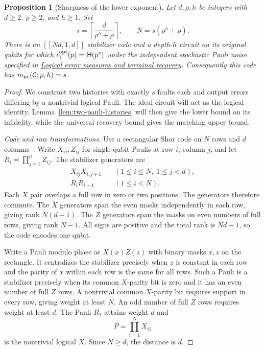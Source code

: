 \documentclass[aps,prl,reprint,notitlepage,nofootinbib,nobibnotes]{revtex4-2}
\newtheorem{proposition}{Proposition}
\begin{document}
\begin{proposition}[Sharpness of the lower exponent]
\label{prop:lower-saturation}
Let $d,\rho,h$ be integers with $d\ge2$, $\rho\ge2$, and $h\ge1$. Set
\begin{equation}\label{em:lower-parameters}
 s=\left\lceil\frac{d}{\rho^h+\rho}\right\rceil,\qquad
 N=s(\rho^h+\rho).
\end{equation}
There is an $[[Nd,1,d]]$ stabilizer code  and a depth-$h$ circuit on its original qubits
for which
$\epsilon_{\rm L}^{\rm opt}(p)=\Theta(p^s)$ under the independent stochastic Pauli noise specified
in \hyperref[sm:logical-error-measures]{Logical error measures and terminal recovery}. Consequently
this code has $m_{\rm pc}(\mathcal C;\rho,h)=s$.
\end{proposition}

\begin{proof}
We construct two histories with exactly $s$ faults each and output errors differing by a nontrivial
logical Pauli. The ideal circuit will act as the logical identity.
Lemma~\ref{lem:two-pauli-histories} will then give the lower bound on its infidelity, while the
universal recovery bound gives the matching upper bound.

\emph{Code and row transformations.}
Use a rectangular Shor code on $N$ rows and $d$ columns~\cite{BaconCasaccino}. Write
$X_{ij},Z_{ij}$ for single-qubit Paulis at row $i$, column $j$, and let $R_i=\prod_{j=1}^d Z_{ij}$.
The stabilizer generators are
\begin{align}
 X_{ij}X_{i,j+1}
 &\quad (1\le i\le N,\ 1\le j<d),\nonumber\\
 R_iR_{i+1}
 &\quad (1\le i<N).
 \label{em:lower-stabilizers}
\end{align}
Each $X$ pair overlaps a full row in zero or two positions. The generators therefore commute. The
$X$ generators span the even masks independently in each row, giving rank $N(d-1)$. The $Z$
generators span the masks on even numbers of full rows, giving rank $N-1$. All signs are positive
and the total rank is $Nd-1$, so the code encodes one qubit.

Write a Pauli modulo phase as $X(x)Z(z)$ with binary masks $x,z$ on the rectangle. It centralizes
the stabilizer precisely when $z$ is constant in each row and the parity of $x$ within each row is
the same for all rows. Such a Pauli is a stabilizer precisely when its common $X$-parity bit is
zero and it has an even number of full $Z$ rows. A nontrivial common $X$-parity bit requires
support in every row, giving weight at least $N$. An odd number of full $Z$ rows requires weight at
least $d$. The Pauli $R_1$ attains weight $d$ and
\begin{equation}\label{em:lower-logical-X}
 P=\prod_{i=1}^N X_{i1}
\end{equation}
is the nontrivial logical $X$. Since $N\ge d$, the distance is $d$.


\end{proof}
\end{document}
